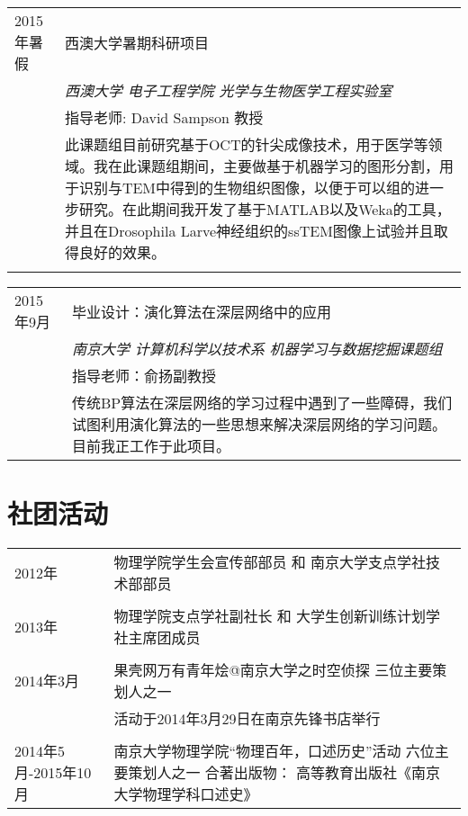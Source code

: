 \documentclass[CHN]{SealZhang}
\begin{document}
\begin{tabular}{p{2cm}|p{12cm}}

\textsc{2015年暑假} & 西澳大学暑期科研项目 \\
&\emph{西澳大学 电子工程学院 光学与生物医学工程实验室}\\
& 指导老师: David Sampson 教授 \\
&\footnotesize{此课题组目前研究基于OCT的针尖成像技术，用于医学等领域。我在此课题组期间，主要做基于机器学习的图形分割，用于识别与TEM中得到的生物组织图像，以便于可以组的进一步研究。在此期间我开发了基于MATLAB以及Weka的工具，并且在Drosophila Larve神经组织的ssTEM图像上试验并且取得良好的效果。}\\

\multicolumn{2}{c}{} \\
\end{tabular}

\begin{tabular}{p{2cm}|p{12cm}}

\textsc{2015年9月} & 毕业设计：演化算法在深层网络中的应用\\
&\emph{南京大学 计算机科学以技术系 机器学习与数据挖掘课题组}\\
& 指导老师：俞扬副教授 \\
&\footnotesize{传统BP算法在深层网络的学习过程中遇到了一些障碍，我们试图利用演化算法的一些思想来解决深层网络的学习问题。目前我正工作于此项目。}\\

\end{tabular}

\section{社团活动}
\begin{tabular}{p{2cm}|p{12cm}}

\textsc{2012年} & 物理学院学生会宣传部部员 和 南京大学支点学社技术部部员 \\
 
 \multicolumn{2}{c}{} \\
 
\textsc{2013年} &  物理学院支点学社副社长 和 大学生创新训练计划学社主席团成员 \\

 \multicolumn{2}{c}{} \\
 
\textsc{2014年3月} &  果壳网万有青年烩@南京大学之时空侦探 三位主要策划人之一   \\ &活动于2014年3月29日在南京先锋书店举行\\

 \multicolumn{2}{c}{} \\
 
\textsc{2014年5月-2015年10月} &  南京大学物理学院“物理百年，口述历史”活动 六位主要策划人之一 
合著出版物： 高等教育出版社《南京大学物理学科口述史》 \\

\end{tabular}
\end{document}
